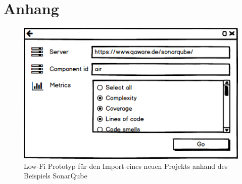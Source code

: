 \chapter{Anhang}

\begin{figure}[htb]
  \includegraphics[width=.8\textwidth]{figures/sonarqube-import}
  \caption{Low-Fi Prototyp für den Import eines neuen Projekts anhand des Beispiels SonarQube}
  \label{fig:sonarqube-import}
\end{figure}

